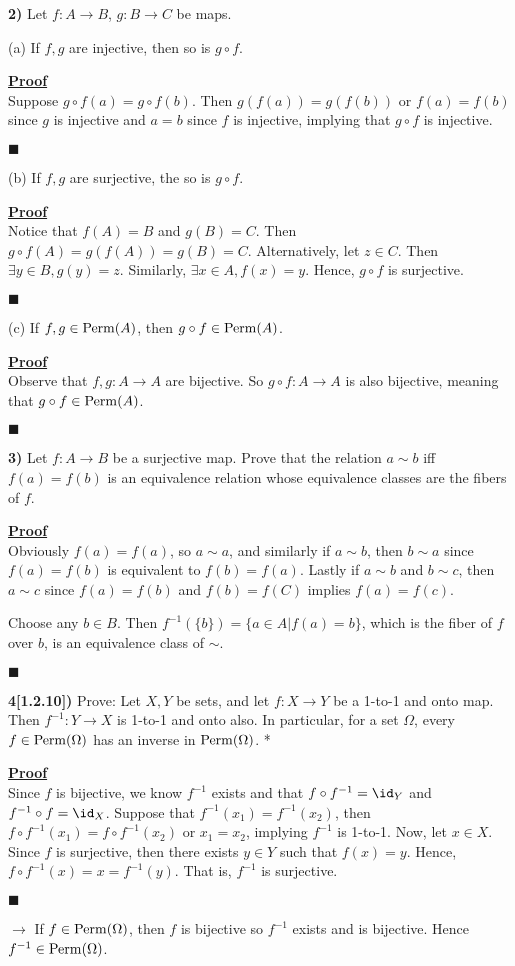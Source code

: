 \documentclass[12pt,a4paper]{article}
\newcommand{\prob}[2]{\textbf{#1)} #2}
\newenvironment{proof}{\textbf{\underline{Proof}} \\}{\begin{flushright}$\blacksquare$\end{flushright}}
\begin{document}
\prob{2}{Let $f: A \rightarrow B$, $g: B \rightarrow C$ be maps.}

(a) If $f,g$ are injective, then so is $g \circ f$.

\begin{proof}
Suppose $g \circ f(a) = g \circ f(b)$. Then $g(f(a)) = g(f(b))$ or $f(a) = f(b)$ since $g$ is injective and $a = b$ since $f$ is injective, implying that $g \circ f$ is injective.
\end{proof}

(b) If $f,g$ are surjective, the so is $g \circ f$.

\begin{proof}
Notice that $f(A) = B$ and $g(B) = C$. Then $g \circ f(A) = g(f(A)) = g(B) = C$. Alternatively, let $z \in C$. Then $\exists y \in B, g(y) = z$. Similarly, $\exists x \in A, f(x) = y$. Hence, $g \circ f$ is surjective.
\end{proof}

(c) If $f,g \in {\rm Perm}(A)$, then $g \circ f \in {\rm Perm}(A)$.

\begin{proof}
Observe that $f,g: A \rightarrow A$ are bijective. So $g \circ f: A \rightarrow A$ is also bijective, meaning that $g \circ f \in {\rm Perm}(A)$.
\end{proof} 

\prob{3}{Let $f: A \rightarrow B$ be a surjective map. Prove that the relation $a \sim b$ iff $f(a) = f(b)$ is an equivalence relation whose equivalence classes are the fibers of $f$.}

\begin{proof}
Obviously $f(a) = f(a)$, so $a \sim a$, and similarly if $a \sim b$, then $b \sim a$ since $f(a) = f(b)$ is equivalent to $f(b) = f(a)$. Lastly if $a \sim b$ and $b \sim c$, then $a \sim c$ since $f(a) = f(b)$ and $f(b) = f(C)$ implies $f(a) = f(c)$.

Choose any $b \in B$. Then $f^{-1}(\{b\}) = \{a \in A | f(a) = b\}$, which is the fiber of $f$ over $b$, is an equivalence class of $\sim$.
\end{proof}

\prob{4[1.2.10]}{Prove: Let $X,Y$ be sets, and let $f: X \rightarrow Y$ be a 1-to-1 and onto map. Then $f^{-1}: Y \rightarrow X$ is 1-to-1 and onto also. In particular, for a set $\Omega$, every $f \in {\rm Perm}(\Omega)$ has an inverse in ${\rm Perm}(\Omega)$. *}

\begin{proof}
Since $f$ is bijective, we know $f^{-1}$ exists and that $f \circ f^{-1} = \id_{Y}$ and $f^{-1} \circ f = \id_{X}$. Suppose that $f^{-1}(x_1) = f^{-1}(x_2)$, then $f \circ f^{-1}(x_1) = f \circ f^{-1}(x_2)$ or $x_1 = x_2$, implying $f^{-1}$ is 1-to-1. Now, let $x \in X$. Since $f$ is surjective, then there exists $y \in Y$ such that $f(x) = y$. Hence, $f \circ f^{-1}(x) = x = f^{-1}(y)$. That is, $f^{-1}$ is surjective.
\end{proof}
$\rightarrow$ If $f \in {\rm Perm}(\Omega)$, then $f$ is bijective so $f^{-1}$ exists and is bijective. Hence $f^{-1} \in {\rm Perm}(\Omega)$.
\end{document}
